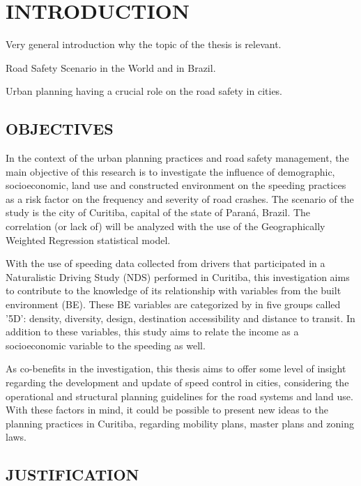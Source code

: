 

\chapter[INTRODUCTION]{INTRODUCTION}

Very general introduction why the topic of the thesis is relevant.

Road Safety Scenario in the World and in Brazil.

Urban planning having a crucial role on the road safety in cities.

\section{OBJECTIVES}

In the context of the urban planning practices and road safety management, the main objective of this research is to investigate the influence of demographic, socioeconomic, land use and constructed environment on the speeding practices as a risk factor on the frequency and severity of road crashes. The scenario of the study is the city of Curitiba, capital of the state of Paraná, Brazil. The correlation (or lack of) will be analyzed with the use of the Geographically Weighted Regression statistical model.

With the use of speeding data collected from drivers that participated in a Naturalistic Driving Study (NDS) performed in Curitiba, this investigation aims to contribute to the knowledge of its relationship with variables from the built environment (BE). These BE variables are categorized by \textcite{Ewing2009} in five groups called '5D': density, diversity, design, destination accessibility and distance to transit. In addition to these variables, this study aims to relate the income as a socioeconomic variable to the speeding as well.

As co-benefits in the investigation, this thesis aims to offer some level of insight regarding the development and update of speed control in cities, considering the operational and structural planning guidelines for the road systems and land use. With these factors in mind, it could be possible to present new ideas to the planning practices in Curitiba, regarding mobility plans, master plans and zoning laws.
    

\section{JUSTIFICATION}


